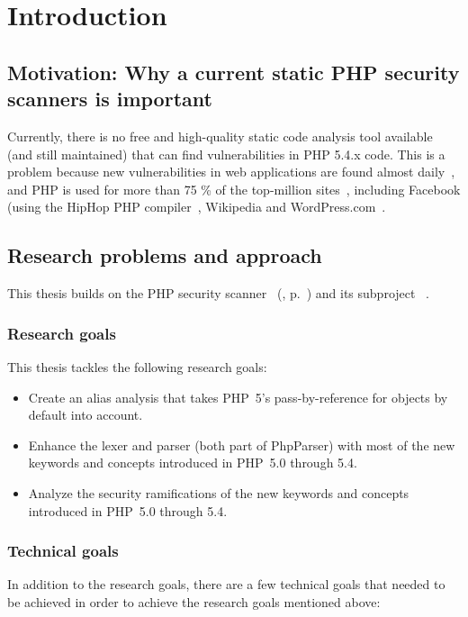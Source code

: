 \chapter{Introduction}

\section{Motivation: Why a current static PHP security scanners is important}
Currently, there is no free and high-quality static code analysis tool available (and still maintained) that can find vulnerabilities in PHP 5.4.x code. This is a problem because new vulnerabilities in web applications are found almost daily~\cite{osvdb}, and PHP is used for more than 75 \% of the top-million sites~\cite{w3techs-php-usage}, including Facebook (using the HipHop PHP compiler~\cite{hiphop}, Wikipedia and WordPress.com~\cite{w3techs-php-sites}.

\section{Research problems and approach}

This thesis builds on the PHP security scanner ~(\cite{pixy}, p.~\pageref{pixy}) and its subproject ~\cite{phpparser}.

\subsection{Research goals}

This thesis tackles the following research goals:

\begin{itemize}
 \item Create an alias analysis that takes PHP~5's pass-by-reference for objects by default into account.
 \item Enhance the lexer and parser (both part of PhpParser) with most of the new keywords and concepts introduced in PHP~5.0 through 5.4.
 \item Analyze the security ramifications of the new keywords and concepts introduced in PHP~5.0 through 5.4.
\end{itemize}

\subsection{Technical goals}

In addition to the research goals, there are a few technical goals that needed to be achieved in order to achieve the research goals mentioned above:

